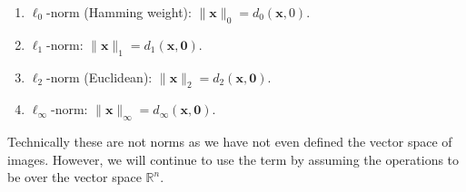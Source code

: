 \documentclass[pdflatex,sn-mathphys-num]{sn-jnl}
\newtheorem{proposition}{Proposition}
\theoremstyle{definition}
\newcommand{\pixel}[1]{\mathsf{#1}}
\newcommand{\vtr}[1]{\mathbf{#1}}
\newcommand{\norm}[1]{\lVert{#1}\rVert}
\begin{document}
\begin{enumerate}
    \item $\ell_0$-norm (Hamming weight): $\lVert \vtr{x} \rVert_0 = d_0(\mathbf{x}, 0)$.
    \item $\ell_1$-norm: $\lVert \vtr{x} \rVert_1 = d_1(\vtr{x}, \vtr{0})$.
    \item $\ell_2$-norm (Euclidean): $\lVert \vtr{x} \rVert_2 = d_2(\vtr{x}, \vtr{0})$.
    \item $\ell_\infty$-norm: $\lVert \vtr{x} \rVert_\infty = d_\infty(\vtr{x}, \vtr{0})$.
\end{enumerate}
Technically these are not norms as we have not even defined the vector space of images. However, we will continue to use the term by assuming the operations to be over the vector space $\mathbb{R}^n$.  
\end{document}
